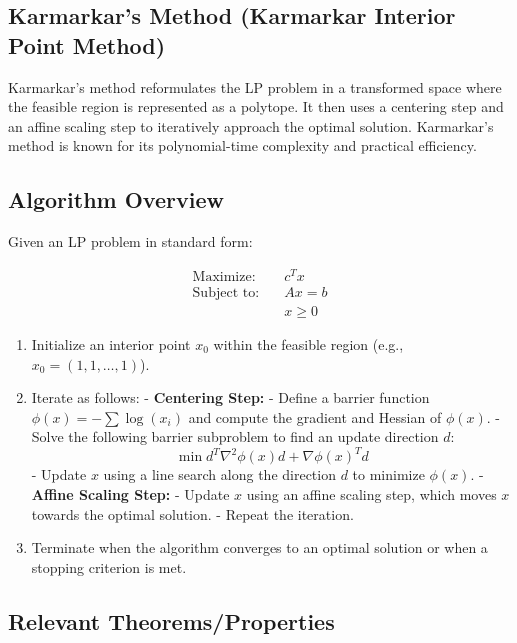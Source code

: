 \documentclass[a4paper]{article}
\begin{document}
\subsection{Karmarkar's Method (Karmarkar Interior Point Method)}

Karmarkar's method reformulates the LP problem in a transformed space where the feasible region is represented as a polytope. It then uses a centering step and an affine scaling step to iteratively approach the optimal solution. Karmarkar's method is known for its polynomial-time complexity and practical efficiency.

\subsection{Algorithm Overview}

Given an LP problem in standard form:

\begin{align*}
\text{Maximize:} \quad & c^Tx \\
\text{Subject to:} \quad & Ax = b \\
& x \geq 0
\end{align*}

\begin{enumerate}
\item Initialize an interior point \(x_0\) within the feasible region (e.g., \(x_0 = (1, 1, \ldots, 1)\)).

\item Iterate as follows:
   - \textbf{Centering Step:}
     - Define a barrier function \(\phi(x) = -\sum \log(x_i)\) and compute the gradient and Hessian of \(\phi(x)\).
     - Solve the following barrier subproblem to find an update direction \(d\):
       \[
       \min d^T \nabla^2 \phi(x) d + \nabla \phi(x)^T d
       \]
     - Update \(x\) using a line search along the direction \(d\) to minimize \(\phi(x)\).
   - \textbf{Affine Scaling Step:}
     - Update \(x\) using an affine scaling step, which moves \(x\) towards the optimal solution.
   - Repeat the iteration.

\item Terminate when the algorithm converges to an optimal solution or when a stopping criterion is met.
\end{enumerate}

\subsection{Relevant Theorems/Properties}
\end{document}
